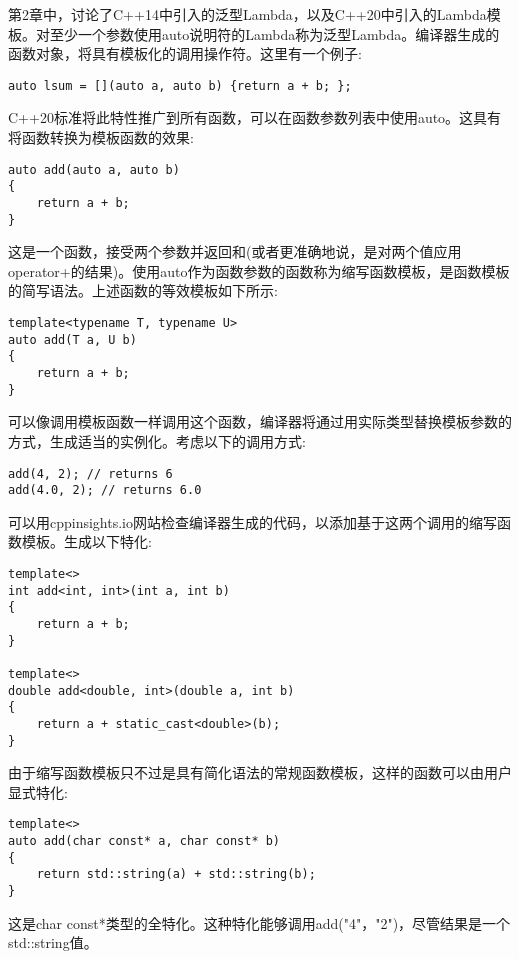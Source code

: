 第2章中，讨论了C++14中引入的泛型Lambda，以及C++20中引入的Lambda模板。对至少一个参数使用auto说明符的Lambda称为泛型Lambda。编译器生成的函数对象，将具有模板化的调用操作符。这里有一个例子:

\begin{lstlisting}[style=styleCXX]
auto lsum = [](auto a, auto b) {return a + b; };
\end{lstlisting}

C++20标准将此特性推广到所有函数，可以在函数参数列表中使用auto。这具有将函数转换为模板函数的效果:

\begin{lstlisting}[style=styleCXX]
auto add(auto a, auto b)
{
	return a + b;
}
\end{lstlisting}

这是一个函数，接受两个参数并返回和(或者更准确地说，是对两个值应用operator+的结果)。使用auto作为函数参数的函数称为缩写函数模板，是函数模板的简写语法。上述函数的等效模板如下所示:

\begin{lstlisting}[style=styleCXX]
template<typename T, typename U>
auto add(T a, U b)
{
	return a + b;
}
\end{lstlisting}

可以像调用模板函数一样调用这个函数，编译器将通过用实际类型替换模板参数的方式，生成适当的实例化。考虑以下的调用方式:

\begin{lstlisting}[style=styleCXX]
add(4, 2); // returns 6
add(4.0, 2); // returns 6.0
\end{lstlisting}

可以用cppinsights.io网站检查编译器生成的代码，以添加基于这两个调用的缩写函数模板。生成以下特化:

\begin{lstlisting}[style=styleCXX]
template<>
int add<int, int>(int a, int b)
{
	return a + b;
}

template<>
double add<double, int>(double a, int b)
{
	return a + static_cast<double>(b);
}
\end{lstlisting}

由于缩写函数模板只不过是具有简化语法的常规函数模板，这样的函数可以由用户显式特化:

\begin{lstlisting}[style=styleCXX]
template<>
auto add(char const* a, char const* b)
{
	return std::string(a) + std::string(b);
}
\end{lstlisting}

这是char const*类型的全特化。这种特化能够调用add("4"，"2")，尽管结果是一个std::string值。

